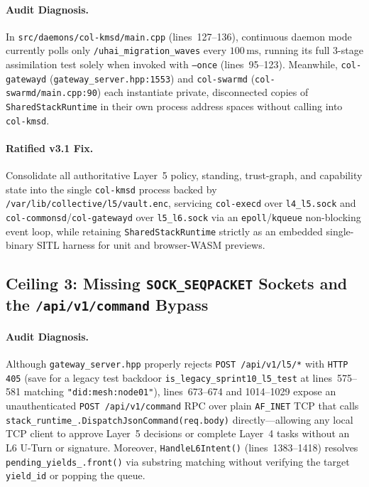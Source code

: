\paragraph{Audit Diagnosis.}
In \texttt{src/daemons/col-kmsd/main.cpp} (lines~127--136), continuous daemon mode currently
polls only \texttt{/uhai\_migration\_waves} every $100\,\mathrm{ms}$, running its full 3-stage
assimilation test solely when invoked with \texttt{--once} (lines~95--123). Meanwhile,
\texttt{col-gatewayd} (\texttt{gateway\_server.hpp:1553}) and \texttt{col-swarmd}
(\texttt{col-swarmd/main.cpp:90}) each instantiate private, disconnected copies of
\texttt{SharedStackRuntime} in their own process address spaces without calling into
\texttt{col-kmsd}.

\paragraph{Ratified v3.1 Fix.}
Consolidate all authoritative Layer~5 policy, standing, trust-graph, and capability state into
the single \texttt{col-kmsd} process backed by \texttt{/var/lib/collective/l5/vault.enc},
servicing \texttt{col-execd} over \texttt{l4\_l5.sock} and \texttt{col-commonsd}/\texttt{col-gatewayd}
over \texttt{l5\_l6.sock} via an \texttt{epoll}/\texttt{kqueue} non-blocking event loop, while
retaining \texttt{SharedStackRuntime} strictly as an embedded single-binary SITL harness for
unit and browser-WASM previews.

\subsection{Ceiling 3: Missing \texttt{SOCK\_SEQPACKET} Sockets and the \texttt{/api/v1/command} Bypass}

\paragraph{Audit Diagnosis.}
Although \texttt{gateway\_server.hpp} properly rejects \texttt{POST /api/v1/l5/*} with
\texttt{HTTP 405} (save for a legacy test backdoor \texttt{is\_legacy\_sprint10\_l5\_test} at
lines~575--581 matching \texttt{"did:mesh:node01"}), lines~673--674 and 1014--1029 expose an
unauthenticated \texttt{POST /api/v1/command} RPC over plain \texttt{AF\_INET} TCP that calls
\texttt{stack\_runtime\_.DispatchJsonCommand(req.body)} directly---allowing any local TCP client
to approve Layer~5 decisions or complete Layer~4 tasks without an L6 U-Turn or signature.
Moreover, \texttt{HandleL6Intent()} (lines~1383--1418) resolves \texttt{pending\_yields\_.front()}
via substring matching without verifying the target \texttt{yield\_id} or popping the queue.

